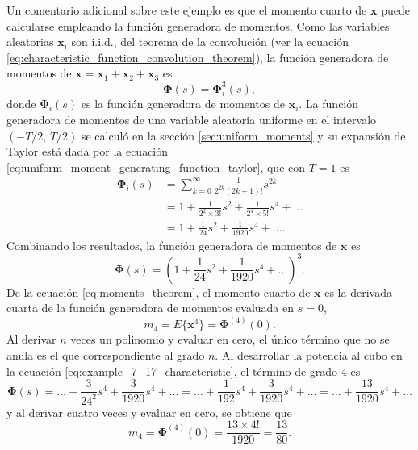\documentclass[a4paper]{report}
\newcommand{\x}{\mathbf{x}}
\newcommand{\Phibf}{\mathbf{\Phi}}
\begin{document}
Un comentario adicional sobre este ejemplo es que el momento cuarto de \(\x\) puede calcularse empleando la función generadora de momentos. Como las variables aleatorias \(\x_i\) son i.i.d., del teorema de la convolución (ver la ecuación \ref{eq:characteristic_function_convolution_theorem}), la función generadora de momentos de \(\x=\x_1+\x_2+\x_3\) es
\[
 \Phibf(s)=\Phibf_i^3(s),
\]
donde \(\Phibf_i(s)\) es la función generadora de momentos de \(\x_i\). La función generadora de momentos de una variable aleatoria uniforme en el intervalo \((-T/2,\,T/2)\) se calculó en la sección \ref{sec:uniform_moments} y su expansión de Taylor está dada por la ecuación \ref{eq:uniform_moment_generating_function_taylor}, que con \(T=1\) es
\begin{align*}
 \Phibf_i(s)&=\sum_{k=0}^\infty\frac{1}{2^{2k}(2k+1)!}s^{2k}\\
   &=1+\frac{1}{2^2\times3!}s^2+\frac{1}{2^4\times5!}s^4+\dots\\
   &=1+\frac{1}{24}s^2+\frac{1}{1920}s^4+\dots.
\end{align*}
Combinando los resultados, la función generadora de momentos de \(\x\) es
\begin{equation}\label{eq:example_7_17_characteristic}
  \Phibf(s)=\left(1+\frac{1}{24}s^2+\frac{1}{1920}s^4+\dots\right)^3.
\end{equation}
De la ecuación \ref{eq:moments_theorem}, el momento cuarto de \(\x\) es la derivada cuarta de la función generadora de momentos evaluada en \(s=0\),
\[
 m_4=E\{\x^4\}=\Phibf^{(4)}(0).
\]
Al derivar \(n\) veces un polinomio y evaluar en cero, el único término que no se anula es el que correspondiente al grado \(n\). Al desarrollar la potencia al cubo en la ecuación \ref{eq:example_7_17_characteristic}, el término de grado 4 es
\[
  \Phibf(s)=\dots+\frac{3}{24^2}s^4+\frac{3}{1920}s^4+\dots=\dots+\frac{1}{192}s^4+\frac{3}{1920}s^4+\dots=\dots+\frac{13}{1920}s^4+\dots
\]
y al derivar cuatro veces y evaluar en cero, se obtiene que
\[
 m_4=\Phibf^{(4)}(0)=\frac{13\times4!}{1920}=\frac{13}{80}.
\]
\end{document}
